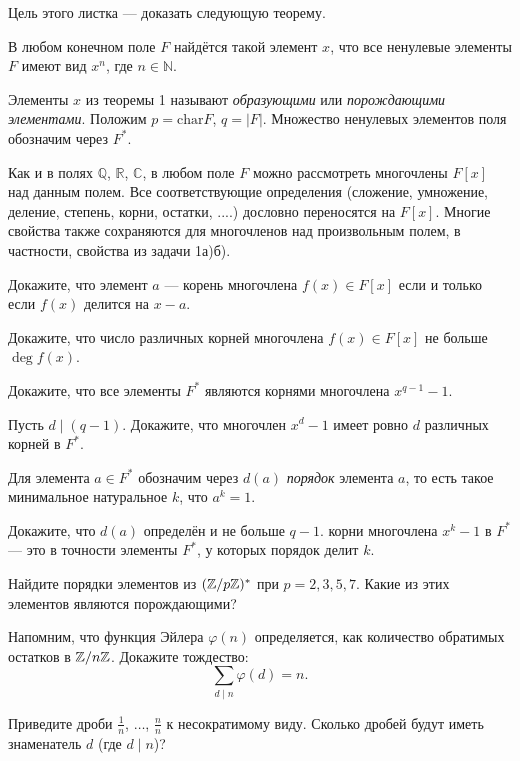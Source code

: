 \documentclass[a4paper,12pt]{article}
\begin{document}
	
	 Цель этого листка --- доказать следующую теорему.
	
\label{T:1} В любом конечном поле $F$ найдётся такой элемент $x$, что все ненулевые элементы $F$ имеют вид $x^n$, где $n \in \mathbb{N}$. 

 Элементы $x$ из теоремы 1 называют {\it образующими} или {\it порождающими элементами}.
{\footnotesize
Положим $p = \mathrm{char} F$, $q = |F|$. Множество ненулевых элементов поля обозначим через $F^*$. }

{\footnotesize Как и в полях $\mathbb{Q}$, $\mathbb{R}$, $\mathbb{C}$, в любом поле $F$ можно рассмотреть многочлены $F[x]$ над данным полем. Все соответствующие определения (сложение, умножение, деление, степень, корни, остатки, ....) дословно переносятся на $F[x]$. Многие свойства также сохраняются для многочленов над произвольным полем, в частности, свойства из задачи 1а)б).}

  Докажите, что элемент $a$ --- корень многочлена $f(x) \in F[x]$ если и только если $f(x)$ делится на $x-a$.

 Докажите, что число различных корней многочлена $f(x) \in F[x]$ не больше $\deg f(x)$.

 Докажите, что все элементы $F^*$ являются корнями многочлена $x^{q-1}-1$.

 Пусть $d \mid (q-1)$. Докажите, что многочлен $x^d-1$ имеет ровно $d$ различных корней в $F^*$.


 Для элемента $a \in F^*$ обозначим через $d(a)$ {\it порядок} элемента $a$, то есть такое минимальное натуральное $k$, что $a^k=1$.

  Докажите, что  $d(a)$ определён и не больше $q-1$.  корни многочлена $x^k-1$ в $F^*$ --- это в точности элементы $F^*$, у которых порядок делит $k$.

 Найдите порядки элементов из $(\mathbb{Z}/p\mathbb{Z})^*$ при $p=2,3,5,7$. Какие из этих элементов являются порождающими?

 Напомним, что функция Эйлера $\varphi(n)$ определяется, как количество обратимых остатков в $\mathbb{Z}/n\mathbb{Z}$. Докажите тождество: $$\sum_{d \mid n} \varphi(d) = n.$$

{\footnotesize {} Приведите дроби $\frac{1}{n}$, $\ldots$, $\frac{n}{n}$ к несократимому виду. Сколько дробей будут иметь знаменатель $d$ (где $d \mid n$)?
}
\end{document}
